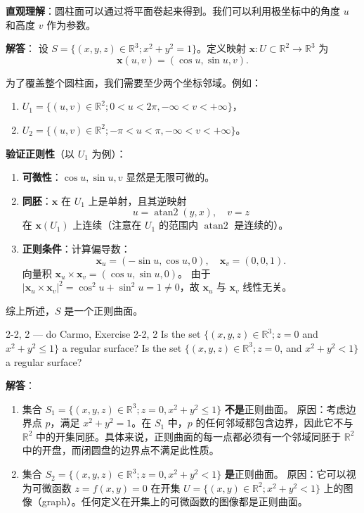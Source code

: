 \begin{solution}
\textbf{直观理解}：圆柱面可以通过将平面卷起来得到。我们可以利用极坐标中的角度 $u$ 和高度 $v$ 作为参数。

\textbf{解答}：
设 $S = \{(x,y,z) \in \mathbb{R}^3; x^2 + y^2 = 1\}$。定义映射 $\mathbf{x}: U \subset \mathbb{R}^2 \to \mathbb{R}^3$ 为
\[
\mathbf{x}(u, v) = (\cos u, \sin u, v).
\]

为了覆盖整个圆柱面，我们需要至少两个坐标邻域。例如：
\begin{enumerate}
    \item $U_1 = \{(u, v) \in \mathbb{R}^2; 0 < u < 2\pi, -\infty < v < +\infty\}$，
    \item $U_2 = \{(u, v) \in \mathbb{R}^2; -\pi < u < \pi, -\infty < v < +\infty\}$。
\end{enumerate}

\textbf{验证正则性}（以 $U_1$ 为例）：
\begin{enumerate}
    \item \textbf{可微性}：$\cos u, \sin u, v$ 显然是无限可微的。
    \item \textbf{同胚}：$\mathbf{x}$ 在 $U_1$ 上是单射，且其逆映射
    \[
    u = \operatorname{atan2}(y, x), \quad v = z
    \]
    在 $\mathbf{x}(U_1)$ 上连续（注意在 $U_1$ 的范围内 $\operatorname{atan2}$ 是连续的）。
    \item \textbf{正则条件}：计算偏导数：
    \[
    \mathbf{x}_u = (-\sin u, \cos u, 0), \quad \mathbf{x}_v = (0, 0, 1).
    \]
    向量积 $\mathbf{x}_u \times \mathbf{x}_v = (\cos u, \sin u, 0)$。
    由于 $|\mathbf{x}_u \times \mathbf{x}_v|^2 = \cos^2 u + \sin^2 u = 1 \neq 0$，故 $\mathbf{x}_u$ 与 $\mathbf{x}_v$ 线性无关。
\end{enumerate}
综上所述，$S$ 是一个正则曲面。
\end{solution}

\begin{exercise}{2-2, 2 — do Carmo, Exercise 2-2, 2}
Is the set $\{(x,y,z)\in \mathbb{R}^3;z = 0$ and $x^{2} + y^{2}\leq 1\}$ a regular surface? Is the set $\{(x,y,z)\in \mathbb{R}^3;z = 0$, and $x^{2} + y^{2} < 1\}$ a regular surface?
\end{exercise}

\begin{solution}
\textbf{解答}：
\begin{enumerate}
    \item 集合 $S_1 = \{(x,y,z) \in \mathbb{R}^3; z = 0, x^2 + y^2 \leq 1\}$ \textbf{不是}正则曲面。
    原因：考虑边界点 $p$，满足 $x^2 + y^2 = 1$。在 $S_1$ 中，$p$ 的任何邻域都包含边界，因此它不与 $\mathbb{R}^2$ 中的开集同胚。具体来说，正则曲面的每一点都必须有一个邻域同胚于 $\mathbb{R}^2$ 中的开盘，而闭圆盘的边界点不满足此性质。

    \item 集合 $S_2 = \{(x,y,z) \in \mathbb{R}^3; z = 0, x^2 + y^2 < 1\}$ \textbf{是}正则曲面。
    原因：它可以视为可微函数 $z = f(x, y) = 0$ 在开集 $U = \{(x, y) \in \mathbb{R}^2; x^2 + y^2 < 1\}$ 上的图像（graph）。任何定义在开集上的可微函数的图像都是正则曲面。
\end{enumerate}
\end{solution}

